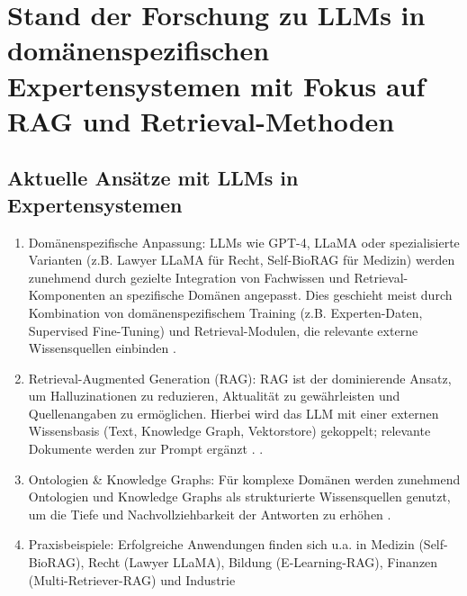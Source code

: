 \section{Stand der Forschung zu LLMs in domänenspezifischen Expertensystemen mit Fokus auf RAG und Retrieval-Methoden} 
\label{sec:Stand der Forschung}
\subsection{Aktuelle Ansätze mit LLMs in Expertensystemen}
\begin{enumerate}
    \item Domänenspezifische Anpassung: LLMs wie GPT-4, LLaMA oder spezialisierte Varianten (z.B. Lawyer LLaMA für Recht, Self-BioRAG für Medizin) werden zunehmend durch gezielte Integration von Fachwissen und Retrieval-Komponenten an spezifische Domänen angepasst. Dies geschieht meist durch Kombination von domänenspezifischem Training (z.B. Experten-Daten, Supervised Fine-Tuning) und Retrieval-Modulen, die relevante externe Wissensquellen einbinden \cite{Huang2023} \cite{Jeong2024Improving} \cite{Abirami2025Evaluating} \cite{Song2025Injecting}.
    \item Retrieval-Augmented Generation (RAG): RAG ist der dominierende Ansatz, um Halluzinationen zu reduzieren, Aktualität zu gewährleisten und Quellenangaben zu ermöglichen. Hierbei wird das LLM mit einer externen Wissensbasis (Text, Knowledge Graph, Vektorstore) gekoppelt; relevante Dokumente werden zur Prompt ergänzt \cite{Barron2024Domain-Specific} \cite{Lu2024Empowering} \cite{DeBellis2024Integrating} \cite{Zhang2025A} \cite{Soman2023Biomedical}.
    \cite{Jeong2024Improving} \cite{Abirami2025Evaluating}.
    \item Ontologien \& Knowledge Graphs: Für komplexe Domänen werden zunehmend Ontologien und Knowledge Graphs als strukturierte Wissensquellen genutzt, um die Tiefe und Nachvollziehbarkeit der Antworten zu erhöhen \cite{Barron2024Domain-Specific} \cite{Zhang2025A} \cite{DeBellis2024Integrating} \cite{Soman2023Biomedical}.
    \item Praxisbeispiele: Erfolgreiche Anwendungen finden sich u.a. in Medizin (Self-BioRAG), Recht (Lawyer LLaMA), Bildung (E-Learning-RAG), Finanzen (Multi-Retriever-RAG) und Industrie \cite{Huang2023} \cite{Barron2024Domain-Specific} \cite{Lu2024Empowering} 
\end{enumerate}

